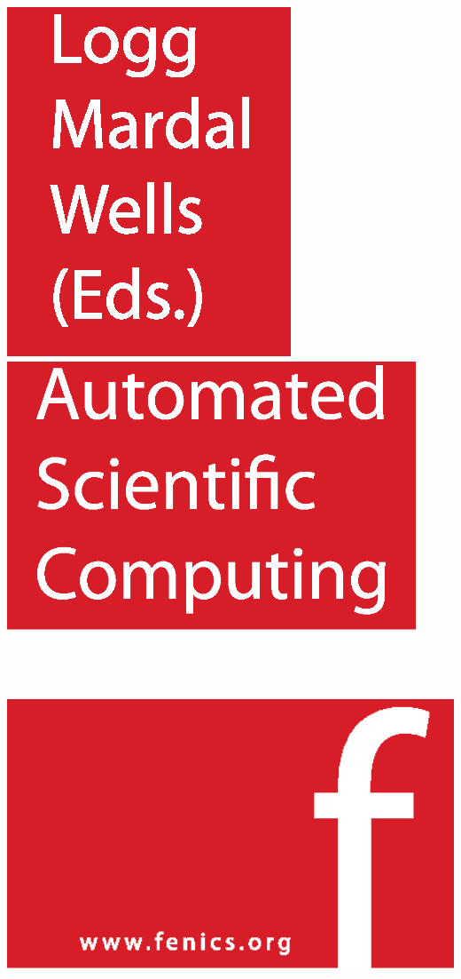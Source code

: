 
\pagestyle{empty}

\changepage{4.9cm}{4cm}{}{-2cm}{}{}{}{}{}
\pagecolor{fenicsred}
\hfill
\includegraphics{frontmatter/eps/editors.eps} \\
\includegraphics[height=8cm]{frontmatter/eps/title.eps}
\vfill
\hfill
\includegraphics[height=12cm]{frontmatter/eps/f.eps}
